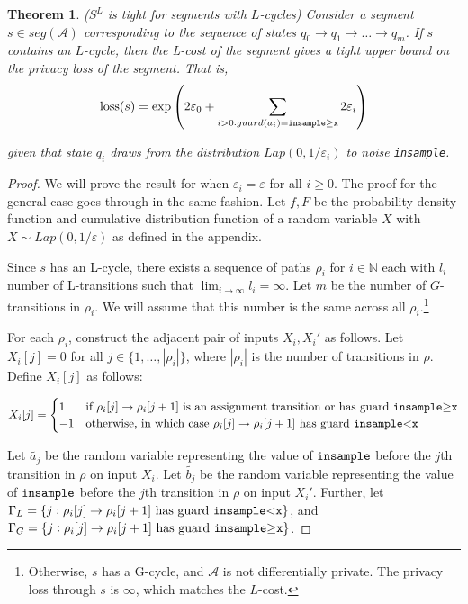 \documentclass{article}
\newcommand{\N}{\mathbb{N}}
\newtheorem{theorem}{Theorem}
\renewcommand{\epsilon}{\varepsilon}
\newcommand{\loss}{\textup{loss}}
\newcommand{\insamplegeqx}{\textup{\texttt{insample$\geq$x}}}
\newcommand{\insampleltx}{\textup{\texttt{insample$<$x}}}
\newcommand{\insample}{\textup{\texttt{insample}}}
\newcommand{\1}{\langle 1 \rangle}
\newcommand{\2}{\langle 2 \rangle}
\begin{document}
\begin{theorem} ($S^L$ is tight for segments with $L$-cycles)
    Consider a segment $s \in seg(\mathcal{A})$ corresponding to the sequence of states $q_0 \to q_1 \to \dots \to q_m$. If $s$ contains an $L$-cycle, then the L-cost of the segment gives a tight upper bound on the privacy loss of the segment. That is, \[\loss(s) =  \exp\left(2 \epsilon_0 + \sum_{i > 0: guard(a_i) = \insamplegeqx} 2\epsilon_i \right)\]

    given that state $q_i$ draws from the distribution $Lap(0, 1/\epsilon_i)$ to noise \insample.
\end{theorem}

\begin{proof}
    We will prove the result for when $\epsilon_i = \epsilon$ for all $i \geq 0$. The proof for the general case goes through in the same fashion. Let $f, F$ be the probability density function and cumulative distribution function of a random variable $X$ with $X \sim Lap(0, 1/\epsilon)$ as defined in the appendix. 

    Since $s$ has an L-cycle, there exists a sequence of paths $\rho_i$ for $i \in \N$ each with $l_i$ number of L-transitions such that $\lim_{i \to \infty} l_i = \infty$. Let $m$ be the number of $G$-transitions in $\rho_i$. We will assume that this number is the same across all $\rho_i$.\footnote{Otherwise, $s$ has a G-cycle, and $\mathcal{A}$ is not differentially private. The privacy loss through $s$ is $\infty$, which matches the $L$-cost.}
    
    For each $\rho_i$, construct the adjacent pair of inputs $X_i, X_i'$ as follows. Let $X_i[j] = 0$ for all $j \in \{1, \dots, |\rho_i|\}$, where $|\rho_i|$ is the number of transitions in $\rho$. Define $X_i[j]$ as follows:

    \[X_i[j] = \begin{cases}
        1 & \text{if } \rho_i[j] \to \rho_i[j + 1] \text{ is an assignment transition or has guard \insamplegeqx} \\
        -1 & \text{otherwise, in which case } \rho_i[j] \to \rho_i[j + 1] \text{ has guard \insampleltx}\\
    \end{cases}\]

    Let $\tilde{a_j}$ be the random variable representing the value of $\insample$ before the $j$th transition in $\rho$ on input $X_i$. Let $\tilde{b_j}$ be the random variable representing the value of $\insample$ before the $j$th transition in $\rho$ on input $X_i'$. Further, let $\Gamma_L = \{j : \rho_i[j] \to \rho_i[j + 1] \text{ has guard } \insampleltx\}$, and $\Gamma_G = \{j : \rho_i[j] \to \rho_i[j + 1] \text{ has guard } \insamplegeqx\}$. 
    

\end{proof}
\end{document}
